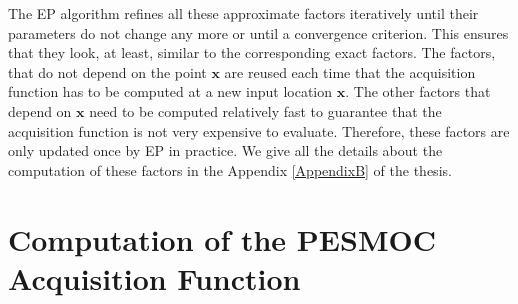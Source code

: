 The EP algorithm refines all these approximate factors iteratively until their parameters do not change any more or until a convergence criterion. This ensures that they look, at least, similar to the corresponding exact factors. The factors, that do not
depend on the point $\textbf{x}$ are reused each time that the acquisition function has to be computed at
a new input location $\mathbf{x}$. The other factors that depend on $\textbf{x}$ need to be computed
relatively fast to guarantee that the acquisition function is not very expensive to evaluate. Therefore,
these factors are only updated once by EP in practice. We give all the details about the computation of these factors in the Appendix \ref{AppendixB} of the thesis.

\section{Computation of the PESMOC Acquisition Function}

